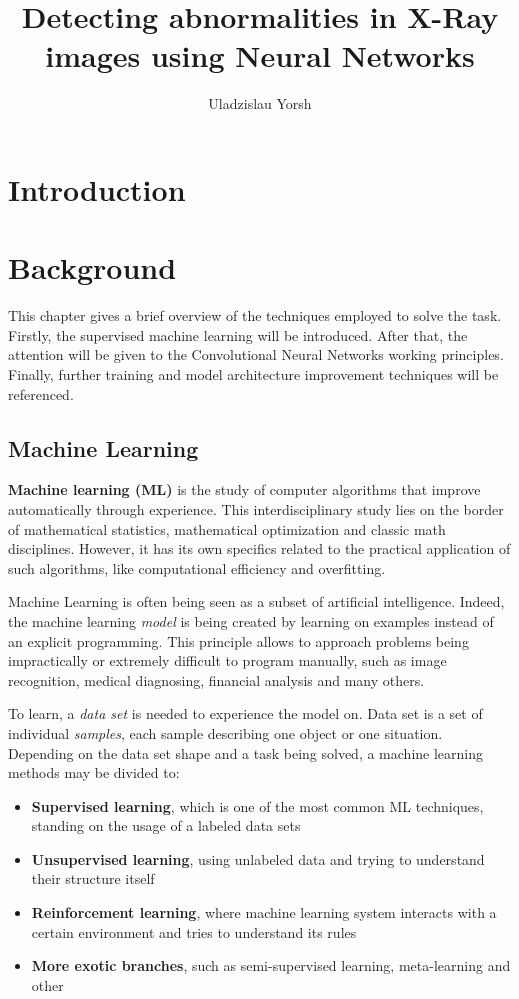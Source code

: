 \documentclass[thesis=B,english]{FITthesis}[2019/12/23]
\title{Detecting abnormalities in X-Ray images using Neural Networks}
\author{Uladzislau Yorsh} %
\begin{document}

\chapter{Introduction}


\chapter{Background}

This chapter gives a brief overview of the techniques employed to solve the task. Firstly, the supervised machine learning will be introduced. After that, the attention will be given to the Convolutional Neural Networks working principles. Finally, further training and model architecture improvement techniques will be referenced.

\section{Machine Learning}

\textbf{Machine learning (ML)} is the study of computer algorithms that improve automatically through experience\cite{machine_learning}. This interdisciplinary study lies on the border of mathematical statistics, mathematical optimization and classic math disciplines. However, it has its own specifics related to the practical application of such algorithms, like computational efficiency and overfitting.

Machine Learning is often being seen as a subset of artificial intelligence. Indeed, the machine learning \textit{model} is being created by learning on examples instead of an explicit programming. This principle allows to approach problems being impractically or extremely difficult to program manually, such as image recognition, medical diagnosing, financial analysis and many others.

To learn, a \textit{data set} is needed to experience the model on. Data set is a set of individual \textit{samples}, each sample describing one object or one situation. Depending on the data set shape and a task being solved, a machine learning methods may be divided to:
\begin{itemize}
	\item \textbf{Supervised learning}, which is one of the most common ML techniques, standing on the usage of a labeled data sets
	\item \textbf{Unsupervised learning}, using unlabeled data and trying to understand their structure itself
	\item \textbf{Reinforcement learning}, where machine learning system interacts with a certain environment and tries to understand its rules
	\item \textbf{More exotic branches}, such as semi-supervised learning, meta-learning and other
\end{itemize}
\end{document}
